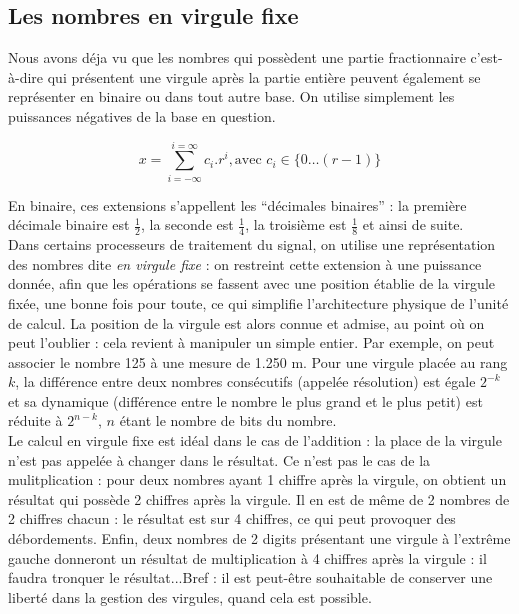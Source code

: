 \subsection{Les nombres en virgule fixe}
Nous avons déja vu que les nombres qui possèdent une partie fractionnaire c'est-à-dire qui présentent une virgule après la partie
entière peuvent également se représenter en binaire ou dans tout autre base. On utilise simplement les puissances négatives de la
base en question.

$$ x = \sum_{i=-\infty}^{i=\infty} c_i.r^i, \mbox{avec } c_i \in \{0\dots (r-1)\} $$

En binaire, ces extensions s'appellent les ``décimales binaires'' : la première décimale binaire est $\frac{1}{2}$,
la seconde est $\frac{1}{4}$, la troisième est $\frac{1}{8}$ et ainsi de suite.\\

Dans certains processeurs de traitement du signal, on utilise une représentation des nombres dite {\it en virgule fixe} :
on restreint cette extension à une puissance donnée, afin que les opérations se fassent avec une position établie de la virgule
fixée, une bonne fois pour toute, ce qui simplifie l'architecture physique de l'unité de calcul. La position de la virgule est
alors connue et admise, au point où on peut l'oublier : cela revient à manipuler un simple entier. Par exemple, on peut associer
le nombre 125 à une mesure de 1.250 m. Pour une virgule placée au rang $k$, la différence entre deux nombres consécutifs
(appelée résolution) est égale $2^{-k}$ et sa dynamique (différence entre le nombre le plus grand et le plus petit) est réduite
à $2^{n-k}$, $n$ étant le nombre de bits du nombre.\\

Le calcul en virgule fixe est idéal dans le cas de l'addition : la place de la virgule n'est pas appelée à changer dans le
résultat. Ce n'est pas le cas de la mulitplication : pour deux nombres ayant 1 chiffre après la virgule, on obtient un résultat
qui possède 2 chiffres après la virgule. Il en est de même de 2 nombres de 2 chiffres chacun : le résultat est sur 4 chiffres,
ce qui peut provoquer des débordements. Enfin, deux nombres de 2 digits présentant une virgule à l'extrême gauche donneront un
résultat de multiplication à 4 chiffres après la virgule : il faudra tronquer le résultat...Bref : il est peut-être souhaitable
de conserver une liberté dans la gestion des virgules, quand cela est possible.

